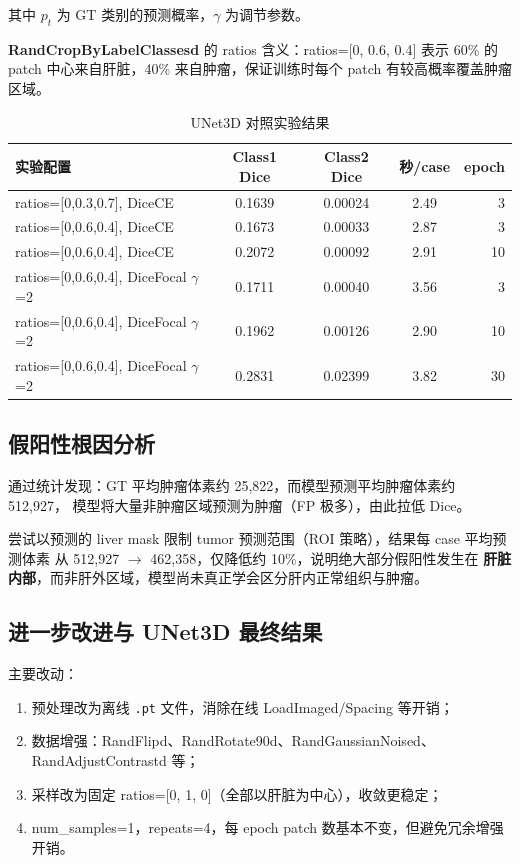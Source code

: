 \documentclass{article}
\begin{document}
	\noindent 其中 $p_t$ 为 GT 类别的预测概率，$\gamma$ 为调节参数。
	
	\vspace{0.5em}
	\noindent\textbf{RandCropByLabelClassesd} 的 ratios 含义：ratios=[0, 0.6, 0.4] 表示
	60\% 的 patch 中心来自肝脏，40\% 来自肿瘤，保证训练时每个 patch 有较高概率覆盖肿瘤区域。
	
	\begin{table}[H]
		\centering
		\caption{UNet3D 对照实验结果}
		\begin{tabular}{lcccr}
			\hline
			\textbf{实验配置} & \textbf{Class1 Dice} & \textbf{Class2 Dice} & \textbf{秒/case} & \textbf{epoch} \\
			\hline
			ratios=[0,0.3,0.7], DiceCE      & 0.1639 & 0.00024 & 2.49 & 3  \\
			ratios=[0,0.6,0.4], DiceCE      & 0.1673 & 0.00033 & 2.87 & 3  \\
			ratios=[0,0.6,0.4], DiceCE      & 0.2072 & 0.00092 & 2.91 & 10 \\
			ratios=[0,0.6,0.4], DiceFocal $\gamma$=2 & 0.1711 & 0.00040 & 3.56 & 3  \\
			ratios=[0,0.6,0.4], DiceFocal $\gamma$=2 & 0.1962 & 0.00126 & 2.90 & 10 \\
			ratios=[0,0.6,0.4], DiceFocal $\gamma$=2 & 0.2831 & 0.02399 & 3.82 & 30 \\
			\hline
		\end{tabular}
	\end{table}
	
	\subsection{假阳性根因分析}
	
	通过统计发现：GT 平均肿瘤体素约 25{,}822，而模型预测平均肿瘤体素约 512{,}927，
	模型将大量非肿瘤区域预测为肿瘤（FP 极多），由此拉低 Dice。
	
	尝试以预测的 liver mask 限制 tumor 预测范围（ROI 策略），结果每 case 平均预测体素
	从 512{,}927 $\rightarrow$ 462{,}358，仅降低约 10\%，说明绝大部分假阳性发生在
	\textbf{肝脏内部}，而非肝外区域，模型尚未真正学会区分肝内正常组织与肿瘤。
	
	\subsection{进一步改进与 UNet3D 最终结果}
	
	主要改动：
	\begin{enumerate}
		\item 预处理改为离线 \texttt{.pt} 文件，消除在线 LoadImaged/Spacing 等开销；
		\item 数据增强：RandFlipd、RandRotate90d、RandGaussianNoised、RandAdjustContrastd 等；
		\item 采样改为固定 ratios=[0, 1, 0]（全部以肝脏为中心），收敛更稳定；
		\item num\_samples=1，repeats=4，每 epoch patch 数基本不变，但避免冗余增强开销。
	\end{enumerate}
	
\end{document}
